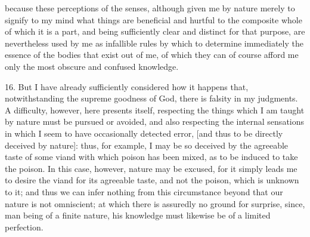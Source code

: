 because these perceptions of the senses, although given me by nature merely to signify to my mind what things are beneficial and hurtful to the composite whole of which it is a part, and being sufficiently clear and distinct for that purpose, are nevertheless used by me as infallible rules by which to determine immediately the essence of the bodies that exist out of me, of which they can of course afford me only the most obscure and confused knowledge.

16. But I have already sufficiently considered how it happens that, notwithstanding the supreme goodness of God, there is falsity in my judgments. A difficulty, however, here presents itself, respecting the things which I am taught by nature must be pursued or avoided, and also respecting the internal sensations in which I seem to have occasionally detected error, [and thus to be directly deceived by nature]: thus, for example, I may be so deceived by the agreeable taste of some viand with which poison has been mixed, as to be induced to take the poison. In this case, however, nature may be excused, for it simply leads me to desire the viand for its agreeable taste, and not the poison, which is unknown to it; and thus we can infer nothing from this circumstance beyond that our nature is not omniscient; at which there is assuredly no ground for surprise, since, man being of a finite nature, his knowledge must likewise be of a limited perfection.

